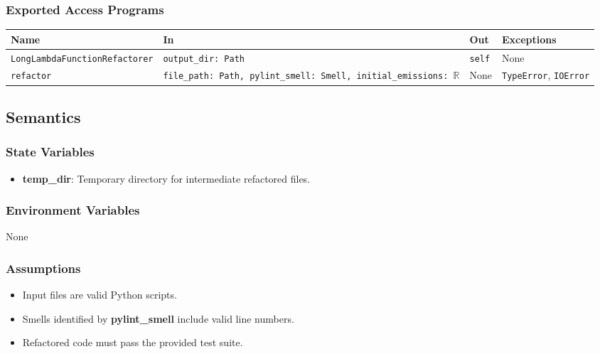 \documentclass[12pt, titlepage]{article}
\begin{document}
\subsubsection{Exported Access Programs}

\begin{center}
\begin{tabularx}{\linewidth}{|l|>{\raggedright\arraybackslash}X|p{1in}|p{1in}|}
\hline
\textbf{Name} & \textbf{In} & \textbf{Out} & \textbf{Exceptions} \\
\hline
\texttt{LongLambdaFunctionRefactorer} & \texttt{output\_dir: Path} & \texttt{self} & None \\
\hline
\texttt{refactor} & \texttt{file\_path: Path, pylint\_smell: Smell, initial\_emissions: $\mathbb{R}$} & None & \texttt{TypeError}, \texttt{IOError} \\
\hline
\end{tabularx}
\end{center}

\subsection{Semantics}

\subsubsection{State Variables}

\begin{itemize}
  \item \textbf{temp\_dir}: Temporary directory for intermediate refactored files.
\end{itemize}

\subsubsection{Environment Variables}
None


\subsubsection{Assumptions}

\begin{itemize}
  \item Input files are valid Python scripts.
  \item Smells identified by \textbf{pylint\_smell} include valid line numbers.
  \item Refactored code must pass the provided test suite.
\end{itemize}
\end{document}
